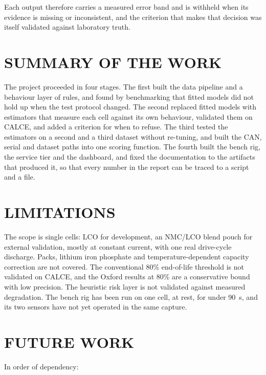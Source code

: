 Each output therefore carries a measured error band and is withheld when its evidence is missing or inconsistent, and the criterion that makes that decision was itself validated against laboratory truth.

\section{SUMMARY OF THE WORK}

The project proceeded in four stages. The first built the data pipeline and a behaviour layer of rules, and found by benchmarking that fitted models did not hold up when the test protocol changed. The second replaced fitted models with estimators that measure each cell against its own behaviour, validated them on CALCE, and added a criterion for when to refuse. The third tested the estimators on a second and a third dataset without re-tuning, and built the CAN, serial and dataset paths into one scoring function. The fourth built the bench rig, the service tier and the dashboard, and fixed the documentation to the artifacts that produced it, so that every number in the report can be traced to a script and a file.

\section{LIMITATIONS}

The scope is single cells: LCO for development, an NMC/LCO blend pouch for external validation, mostly at constant current, with one real drive-cycle discharge. Packs, lithium iron phosphate and temperature-dependent capacity correction are not covered. The conventional 80\% end-of-life threshold is not validated on CALCE, and the Oxford results at 80\% are a conservative bound with low precision. The heuristic risk layer is not validated against measured degradation. The bench rig has been run on one cell, at rest, for under 90~s, and its two sensors have not yet operated in the same capture.

\section{FUTURE WORK}

In order of dependency:

